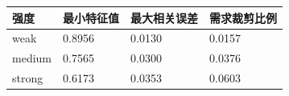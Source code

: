 \begin{tabular}{llll}
\toprule
强度 & 最小特征值 & 最大相关误差 & 需求裁剪比例 \\
\midrule
weak & 0.8956 & 0.0130 & 0.0157 \\
medium & 0.7565 & 0.0300 & 0.0376 \\
strong & 0.6173 & 0.0353 & 0.0603 \\
\bottomrule
\end{tabular}
